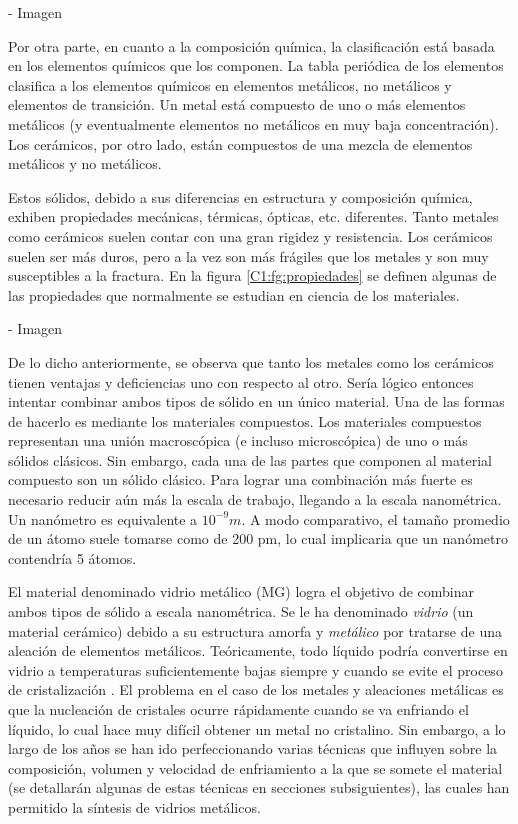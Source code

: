 - Imagen

Por otra parte, en cuanto a la composición química, la clasificación está basada en los elementos químicos que los componen. La tabla periódica de los elementos clasifica a los elementos químicos en elementos metálicos, no metálicos y elementos de transición. Un metal está compuesto de uno o más elementos metálicos (y eventualmente elementos no metálicos en muy baja concentración). Los cerámicos, por otro lado, están compuestos de una mezcla de elementos metálicos y no metálicos. 

Estos sólidos, debido a sus diferencias en estructura y composición química, exhiben propiedades mecánicas, térmicas, ópticas, etc. diferentes. Tanto metales como cerámicos suelen contar con una gran rigidez y resistencia. Los cerámicos suelen ser más duros, pero a la vez son más frágiles que los metales y son muy susceptibles a la fractura. En la figura \ref{C1:fg:propiedades} se definen algunas de las propiedades que normalmente se estudian en ciencia de los materiales.

- Imagen

De lo dicho anteriormente, se observa que tanto los metales como los cerámicos tienen ventajas y deficiencias uno con respecto al otro. Sería lógico entonces intentar combinar ambos tipos de sólido en un único material. Una de las formas de hacerlo es mediante los materiales compuestos. Los materiales compuestos representan una unión macroscópica (e incluso microscópica) de uno o más sólidos clásicos. Sin embargo, cada una de las partes que componen al material compuesto son un sólido clásico. Para lograr una combinación más fuerte es necesario reducir aún más la escala de trabajo, llegando a la escala nanométrica. Un nanómetro es equivalente a $10^{-9} m$. A modo comparativo, el tamaño promedio de un átomo suele tomarse como de 200 pm, lo cual implicaria que un nanómetro contendría 5 átomos.

El material denominado vidrio metálico (MG) logra el objetivo de combinar ambos tipos de sólido a escala nanométrica. Se le ha denominado \textit{vidrio} (un material cerámico) debido a su estructura amorfa y \textit{metálico} por tratarse de una aleación de elementos metálicos. Teóricamente, todo líquido podría convertirse en vidrio a temperaturas suficientemente bajas siempre y cuando se evite el proceso de cristalización \citep{turnbull61}. El problema en el caso de los metales y aleaciones metálicas es que la nucleación de cristales ocurre rápidamente cuando se va enfriando el líquido, lo cual hace muy difícil obtener un metal no cristalino. Sin embargo, a lo largo de los años se han ido perfeccionando varias técnicas que influyen sobre la composición, volumen y velocidad de enfriamiento a la que se somete el material (se detallarán algunas de estas técnicas en secciones subsiguientes), las cuales han permitido la síntesis de vidrios metálicos.

